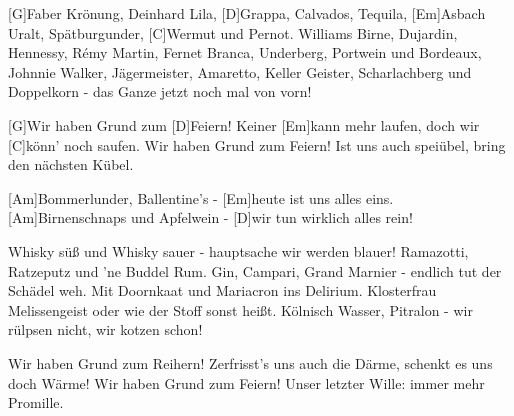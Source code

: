 

\begin{guitar}
	[G]Faber Krönung, Deinhard Lila, [D]Grappa, Calvados, Tequila,
	[Em]Asbach Uralt, Spätburgunder, [C]Wermut und Pernot.
	Williams Birne, Dujardin, Hennessy, Rémy Martin,
	Fernet Branca, Underberg, Portwein und Bordeaux,
	Johnnie Walker, Jägermeister, Amaretto, Keller Geister,
	Scharlachberg und Doppelkorn - das Ganze jetzt noch mal von vorn!
	
	[G]Wir haben Grund zum [D]Feiern!
	Keiner [Em]kann mehr laufen, doch wir [C]könn' noch saufen.
	Wir haben Grund zum Feiern!
	Ist uns auch speiübel, bring den nächsten Kübel.
	
	[Am]Bommerlunder, Ballentine's - [Em]heute ist uns alles eins.
	[Am]Birnenschnaps und Apfelwein - [D]wir tun wirklich alles rein!
	
	Whisky süß und Whisky sauer - hauptsache wir werden blauer!
	Ramazotti, Ratzeputz und 'ne Buddel Rum.
	Gin, Campari, Grand Marnier - endlich tut der Schädel weh.
	Mit Doornkaat und Mariacron ins Delirium.
	Klosterfrau Melissengeist oder wie der Stoff sonst heißt.
	Kölnisch Wasser, Pitralon - wir rülpsen nicht, wir kotzen schon!
	
	Wir haben Grund zum Reihern!
	Zerfrisst's uns auch die Därme, schenkt es uns doch Wärme!
	Wir haben Grund zum Feiern!
	Unser letzter Wille: immer mehr Promille.
\end{guitar}
